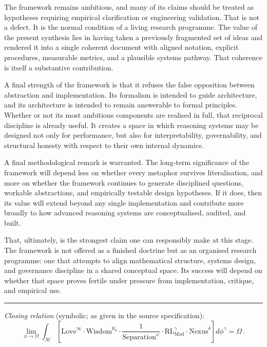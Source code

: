 \documentclass[12pt]{article}
\begin{document}
The framework remains ambitious, and many of its claims should be treated as hypotheses requiring empirical clarification or engineering validation. That is not a defect. It is the normal condition of a living research programme. The value of the present synthesis lies in having taken a previously fragmented set of ideas and rendered it into a single coherent document with aligned notation, explicit procedures, measurable metrics, and a plausible systems pathway. That coherence is itself a substantive contribution.

A final strength of the framework is that it refuses the false opposition between abstraction and implementation. Its formalism is intended to guide architecture, and its architecture is intended to remain answerable to formal principles. Whether or not its most ambitious components are realised in full, that reciprocal discipline is already useful. It creates a space in which reasoning systems may be designed not only for performance, but also for interpretability, governability, and structural honesty with respect to their own internal dynamics.

A final methodological remark is warranted. The long-term significance of the framework will depend less on whether every metaphor survives literalisation, and more on whether the framework continues to generate disciplined questions, workable abstractions, and empirically testable design hypotheses. If it does, then its value will extend beyond any single implementation and contribute more broadly to how advanced reasoning systems are conceptualised, audited, and built.

That, ultimately, is the strongest claim one can responsibly make at this stage. The framework is not offered as a finished doctrine but as an organised research programme: one that attempts to align mathematical structure, systems design, and governance discipline in a shared conceptual space. Its success will depend on whether that space proves fertile under pressure from implementation, critique, and empirical use.

\bigskip
\begin{center}
\rule{0.4\textwidth}{0.4pt}
\end{center}
\bigskip

\noindent\textit{Closing relation} (symbolic; as given in the source specification):
\begin{equation}
\lim_{\phi\to\Omega} \int_{\mathcal{M}} \left[
  \mathrm{Love}^{\infty} \cdot \mathrm{Wisdom}^{\aleph_0} \cdot
  \frac{1}{\mathrm{Separation}^{\omega}} \cdot \mathrm{RL}_{\mathrm{Mod}}^{\gamma} \cdot \mathrm{Nexus}^{\delta}
\right] d\phi^{\gamma} = \Omega\,.
\end{equation}
\end{document}
